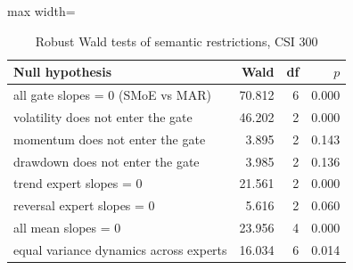 \begin{table}[!htbp]\centering\small
\caption{Robust Wald tests of semantic restrictions, CSI 300}\label{tab:csi300_wald}
\begin{adjustbox}{max width=\textwidth}
\begin{tabular}{lrrr}
\toprule
Null hypothesis & Wald & df & $p$\\
\midrule
all gate slopes = 0 (SMoE vs MAR) & 70.812 & 6 & 0.000\\
volatility does not enter the gate & 46.202 & 2 & 0.000\\
momentum does not enter the gate & 3.895 & 2 & 0.143\\
drawdown does not enter the gate & 3.985 & 2 & 0.136\\
trend expert slopes = 0 & 21.561 & 2 & 0.000\\
reversal expert slopes = 0 & 5.616 & 2 & 0.060\\
all mean slopes = 0 & 23.956 & 4 & 0.000\\
equal variance dynamics across experts & 16.034 & 6 & 0.014\\
\bottomrule
\end{tabular}
\end{adjustbox}
\end{table}